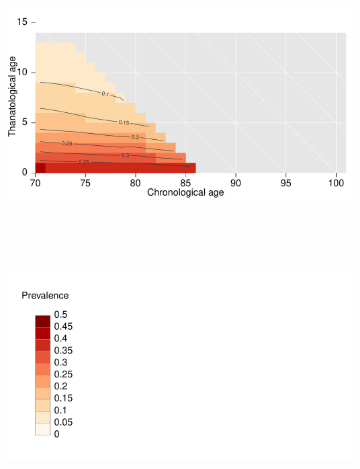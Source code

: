 \documentclass[12pt,oneside,a4paper,doublespacing]{article} %
\theoremstyle{definition}
\begin{document}
\begin{figure}[h!]
\begin{subfigure}{.46\textwidth}
\centering
\caption{~}
\includegraphics[scale=0.32]{srhpoor1925.pdf}
\end{subfigure}
~
\begin{subfigure}{.46\textwidth}
\centering
\caption{~}
\includegraphics[scale=0.32]{Legend.pdf}
\end{subfigure}
\end{figure} 
\end{document}
